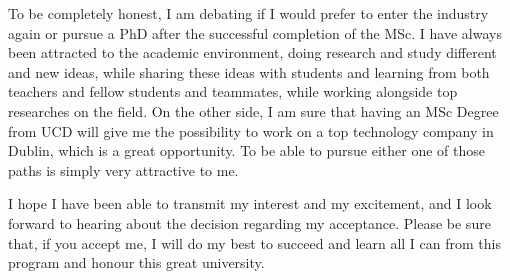 \documentclass{article}
\begin{document}
To be completely honest, I am debating if I would prefer to enter the industry again or pursue a PhD after the successful completion of the MSc. I have always been attracted to the academic environment, doing research and study different and new ideas, while sharing these ideas with students and learning from both teachers and fellow students and teammates, while working alongside top researches on the field. On the other side, I am sure that having an MSc Degree from UCD will give me the possibility to work on a top technology company in Dublin, which is a great opportunity. To be able to pursue either one of those paths is simply very attractive to me.

I hope I have been able to transmit my interest and my excitement, and I look forward to hearing about the decision regarding my acceptance. Please be sure that, if you accept me, I will do my best to succeed and learn all I can from this program and honour this great university.
\end{document}
